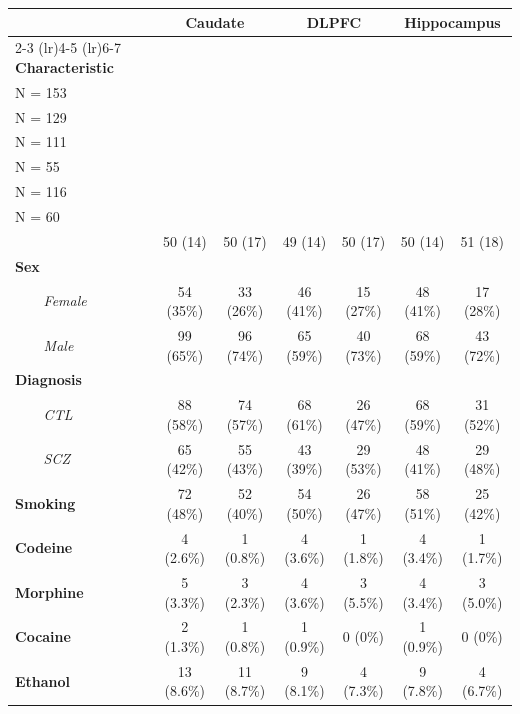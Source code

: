 \begin{table}[t]
\fontsize{12.0pt}{14.0pt}\selectfont
\begin{tabular*}{\linewidth}{@{\extracolsep{\fill}}lcccccc}
\toprule
 & \multicolumn{2}{c}{\textbf{Caudate}} & \multicolumn{2}{c}{\textbf{DLPFC}} & \multicolumn{2}{c}{\textbf{Hippocampus}} \\ 
\cmidrule(lr){2-3} \cmidrule(lr){4-5} \cmidrule(lr){6-7}
\textbf{Characteristic} & \shortstack[l]{\textbf{AA} \\N = 153}\textsuperscript{\textit{1}} & \shortstack[l]{\textbf{EA} \\N = 129}\textsuperscript{\textit{1}} & \shortstack[l]{\textbf{AA} \\N = 111}\textsuperscript{\textit{1}} & \shortstack[l]{\textbf{EA} \\N = 55}\textsuperscript{\textit{1}} & \shortstack[l]{\textbf{AA} \\N = 116}\textsuperscript{\textit{1}} & \shortstack[l]{\textbf{EA} \\N = 60}\textsuperscript{\textit{1}} \\ 
\midrule\addlinespace[2.5pt]
{\bfseries Age} & 50 (14) & 50 (17) & 49 (14) & 50 (17) & 50 (14) & 51 (18) \\ 
{\bfseries Sex} &  &  &  &  &  &  \\ 
{\itshape     Female} & 54 (35\%) & 33 (26\%) & 46 (41\%) & 15 (27\%) & 48 (41\%) & 17 (28\%) \\ 
{\itshape     Male} & 99 (65\%) & 96 (74\%) & 65 (59\%) & 40 (73\%) & 68 (59\%) & 43 (72\%) \\ 
{\bfseries Diagnosis} &  &  &  &  &  &  \\ 
{\itshape     CTL} & 88 (58\%) & 74 (57\%) & 68 (61\%) & 26 (47\%) & 68 (59\%) & 31 (52\%) \\ 
{\itshape     SCZ} & 65 (42\%) & 55 (43\%) & 43 (39\%) & 29 (53\%) & 48 (41\%) & 29 (48\%) \\ 
{\bfseries Smoking} & 72 (48\%) & 52 (40\%) & 54 (50\%) & 26 (47\%) & 58 (51\%) & 25 (42\%) \\ 
{\bfseries Codeine} & 4 (2.6\%) & 1 (0.8\%) & 4 (3.6\%) & 1 (1.8\%) & 4 (3.4\%) & 1 (1.7\%) \\ 
{\bfseries Morphine} & 5 (3.3\%) & 3 (2.3\%) & 4 (3.6\%) & 3 (5.5\%) & 4 (3.4\%) & 3 (5.0\%) \\ 
{\bfseries Cocaine} & 2 (1.3\%) & 1 (0.8\%) & 1 (0.9\%) & 0 (0\%) & 1 (0.9\%) & 0 (0\%) \\ 
{\bfseries Ethanol} & 13 (8.6\%) & 11 (8.7\%) & 9 (8.1\%) & 4 (7.3\%) & 9 (7.8\%) & 4 (6.7\%) \\ 

\end{tabular*}
\end{table}
